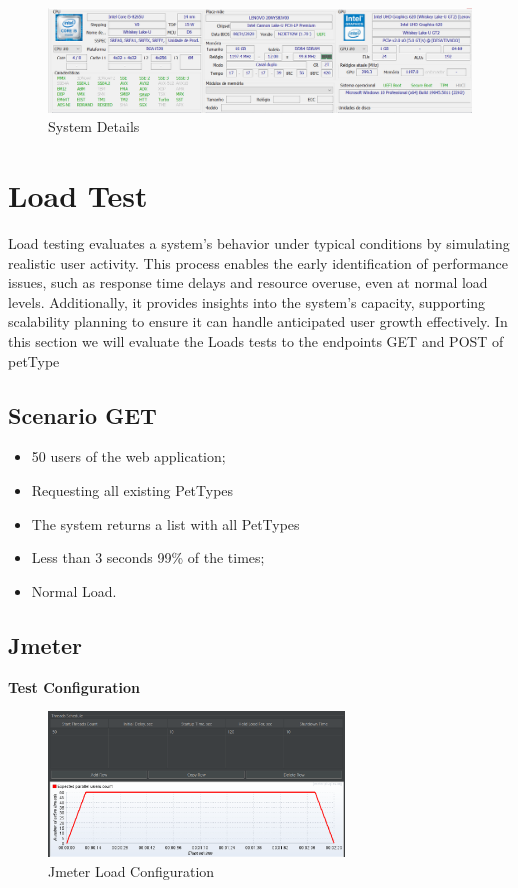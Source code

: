 \documentclass[a4paper,11pt,openright,BCOR=15mm]{scrbook}
\begin{document}
  	\begin{figure}[h]
    	\centering
    	\includegraphics[width=\textwidth]{figs/Performance/SystemDetails.png}
    	\caption{System Details}
    	\label{fig:SystemDetails}
  	\end{figure}

\section{Load Test}
		
		Load testing evaluates a system's behavior under typical conditions by simulating realistic user activity. This process enables the early identification of performance issues, such as response time delays and resource overuse, even at normal load levels. Additionally, it provides insights into the system’s capacity, supporting scalability planning to ensure it can handle anticipated user growth effectively.
		In this section we will evaluate the Loads tests to the endpoints GET and POST of petType
		\subsection{Scenario GET}
		\begin{itemize}
			\item 50 users of the web application;
	           \item Requesting all existing PetTypes
			\item The system returns a list with all PetTypes
			\item Less than 3 seconds 99\% of the times;
			\item Normal Load.
		\end{itemize}


		\subsection{Jmeter}


		\textbf{Test Configuration}

		\begin{figure}[H]
			\centering
			\includegraphics[width=0.7\textwidth]{figs/Performance/Test Configuration/JMETER-LOAD.png}
			\caption{Jmeter Load Configuration}
			\label{fig:JMETER-LOAD}
		\end{figure}
\end{document}
